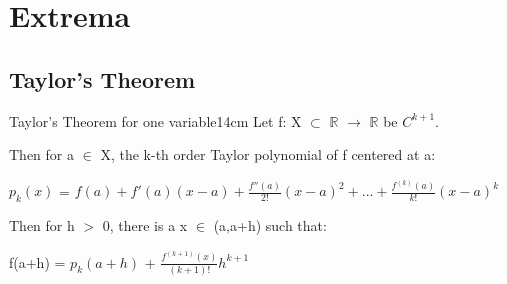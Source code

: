 \newpage

\section[Day 3: Extrema]{ Extrema }

\subsection{ Taylor's Theorem }

    \begin{wtheorem}{Taylor's Theorem for one variable}{14cm}
        Let f: X $\subset$ $\mathbb{R}$ $\rightarrow$ $\mathbb{R}$
        be $C^{k+1}$.
        
        Then for a $\in$ X, the k-th order Taylor polynomial of f centered at a:

        \hspace{0.5cm}
        $p_k(x)$
        = $f(a) + f'(a)(x-a) + \frac{f''(a)}{2!}(x-a)^2
            + ... + \frac{f^{(k)}(a)}{k!}(x-a)^k$

        Then for h $>$ 0, there is a x $\in$ (a,a+h) such that:

        \hspace{0.5cm}
        f(a+h) = $p_k(a+h)$ + $\frac{f^{(k+1)}(x)}{(k+1)!}h^{k+1}$
    \end{wtheorem}

